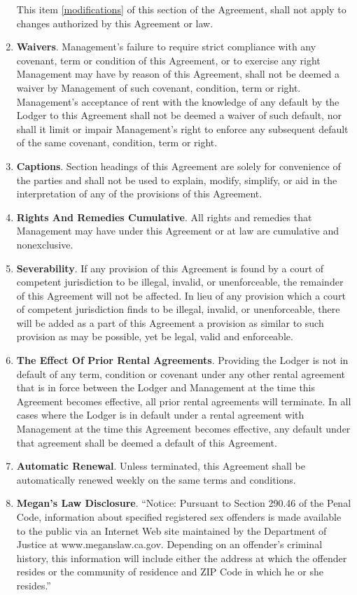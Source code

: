 \documentclass[12pt,letterpaper]{article}
\newcommand{\lodger}{Lodger}
\newcommand{\management}{Management}
\begin{document}
\begin{enumerate}
			This item \ref{modifications} of this section of the Agreement, shall not apply to changes authorized by this Agreement or law.
		\item \textbf{Waivers}. 
			\management{}'s failure to require strict compliance with any covenant, term or condition of this Agreement, or to exercise any right \management{} may have by reason of this Agreement, shall not be deemed a waiver by \management{} of such covenant, condition, term or right. \management{}'s acceptance of rent with the knowledge of any default by the \lodger{} to this Agreement shall not be deemed a waiver of such default, nor shall it limit or impair \management{}'s right to enforce any subsequent default of the same covenant, condition, term or right. 
		\item \textbf{Captions}. 
			Section headings of this Agreement are solely for convenience of the parties and shall not be used to explain, modify, simplify, or aid in the interpretation of any of the provisions of this Agreement. 
		\item \textbf{Rights And Remedies Cumulative}. 
			All rights and remedies that \management{} may have under this Agreement or at law are cumulative and nonexclusive. 
		\item \textbf{Severability}. 
			If any provision of this Agreement is found by a court of competent jurisdiction to be illegal, invalid, or unenforceable, the remainder of this Agreement will not be affected. In lieu of any provision which a court of competent jurisdiction finds to be illegal, invalid, or unenforceable, there will be added as a part of this Agreement a provision as similar to such provision as may be possible, yet be legal, valid and enforceable. 
		\item \textbf{The Effect Of Prior Rental Agreements}. 
			Providing the \lodger{} is not in default of any term, condition or covenant under any other rental agreement that is in force between the \lodger{} and \management{} at the time this Agreement becomes effective, all prior rental agreements will terminate. In all cases where the \lodger{} is in default under a rental agreement with \management{} at the time this Agreement becomes effective, any default under that agreement shall be deemed a default of this Agreement. 
		\item \textbf{Automatic Renewal}.
			Unless terminated, this Agreement shall be automatically renewed weekly on the same terms and conditions. 
		\item \textbf{Megan's Law Disclosure}.
			``Notice: Pursuant to Section 290.46 of the Penal Code, information about specified registered sex offenders is made available to the public via an Internet Web site maintained by the Department of Justice at www.meganslaw.ca.gov. Depending on an offender's criminal history, this information will include either the address at which the offender resides or the community of residence and ZIP Code in which he or she resides.''
	\end{enumerate}
\end{document}
